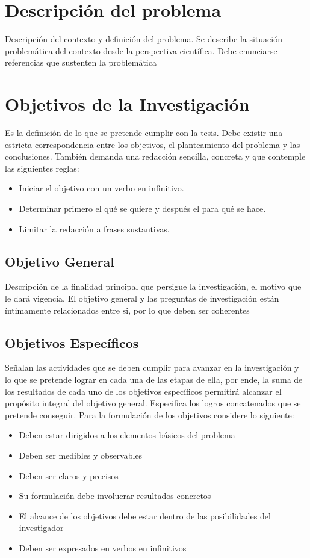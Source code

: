 \documentclass{informe_investigacion}
\begin{document}
\section{Descripción del problema}
Descripción del contexto y definición del problema. Se describe la situación problemática del contexto desde la perspectiva científica. Debe enunciarse referencias que sustenten la problemática

\section{Objetivos de la Investigación}
Es la definición de lo que se pretende cumplir con la tesis. Debe existir una estricta correspondencia entre los objetivos, el planteamiento del problema y las conclusiones. También demanda una redacción sencilla, concreta y que contemple las siguientes reglas:
\begin{itemize}
    \item Iniciar el objetivo con un verbo en infinitivo.
    \item Determinar primero el qué se quiere y después el para qué se hace.
    \item Limitar la redacción a frases sustantivas.
\end{itemize}

\subsection{Objetivo General}
Descripción de la finalidad principal que persigue la investigación, el motivo que le dará vigencia. El objetivo general y las preguntas de investigación están íntimamente relacionados entre si, por lo que deben ser coherentes

\subsection{Objetivos Específicos}
Señalan las actividades que se deben cumplir para avanzar en la investigación y lo que se pretende lograr en cada una de las etapas de ella, por ende, la suma de los resultados de cada uno de los objetivos específicos permitirá alcanzar el propósito integral del objetivo general. Especifica los logros concatenados que se pretende conseguir.
Para la formulación de los objetivos considere lo siguiente:
\begin{itemize}
    \item Deben estar dirigidos a los elementos básicos del problema
    \item Deben ser medibles y observables
    \item Deben ser claros y precisos
    \item Su formulación debe involucrar resultados concretos
    \item El alcance de los objetivos debe estar dentro de las posibilidades del investigador
    \item Deben ser expresados en verbos en infinitivos
\end{itemize}
\end{document}

